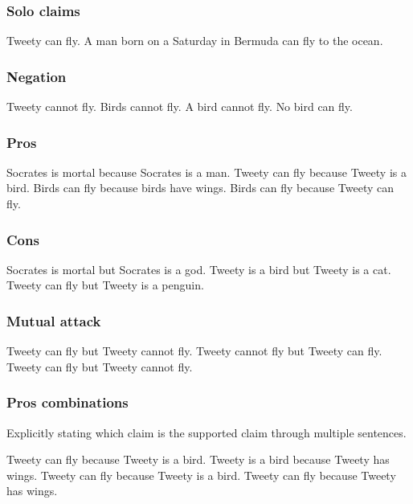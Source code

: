 \subsubsection{Solo claims}
\begin{exe}
\ex\label{e1} Tweety can fly.
\ex\label{e2} A man born on a Saturday in Bermuda can fly to the ocean.
\end{exe}

\subsubsection{Negation}
\begin{exe}
\ex\label{e3} Tweety cannot fly.
\ex\label{e4} Birds cannot fly.
\ex\label{e5} A bird cannot fly.
\ex\label{e6} No bird can fly.
\end{exe}

\subsubsection{Pros}
\begin{exe}
\ex\label{e7} Socrates is mortal because Socrates is a man.
\ex\label{e8} Tweety can fly because Tweety is a bird.
\ex\label{e9} Birds can fly because birds have wings.
\ex\label{e70} Birds can fly because Tweety can fly.
\end{exe}

\subsubsection{Cons}
\begin{exe}
\ex\label{e10} Socrates is mortal but Socrates is a god.
\ex\label{e11} Tweety is a bird but Tweety is a cat.
\ex\label{e12} Tweety can fly but Tweety is a penguin.
\end{exe}

\subsubsection{Mutual attack}
\begin{exe}
\ex\label{e14} Tweety can fly but Tweety cannot fly. Tweety cannot fly but Tweety can fly.
\ex\label{e15} Tweety can fly but Tweety cannot fly.
\end{exe}

\subsubsection{Pros combinations}
Explicitly stating which claim is the supported claim through multiple sentences.
\begin{exe}
\ex\label{e16} Tweety can fly because Tweety is a bird. Tweety is a bird because Tweety has wings.
\ex\label{e17} Tweety can fly because Tweety is a bird. Tweety can fly because Tweety has wings.
\end{exe}


